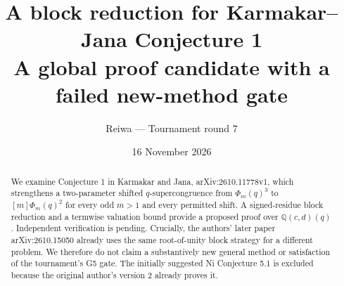 \documentclass[11pt,a4paper]{article}
\title{A block reduction for Karmakar--Jana Conjecture 1\\[5pt]\large A global proof candidate with a failed new-method gate}
\author{Reiwa --- Tournament round 7}
\date{16 November 2026}
\begin{document}
\maketitle
\begin{abstract}
We examine Conjecture 1 in Karmakar and Jana, arXiv:2610.11778v1, which
strengthens a two-parameter shifted $q$-supercongruence from
$\Phi_m(q)^3$ to $[m]\Phi_m(q)^2$ for every odd $m>1$ and every permitted
shift. A signed-residue block reduction and a termwise valuation bound
provide a proposed proof over $\mathbb Q(c,d)(q)$. Independent verification
is pending. Crucially, the authors' later paper arXiv:2610.15050 already
uses the same root-of-unity block strategy for a different problem.
We therefore do not claim a substantively new general method or satisfaction
of the tournament's G5 gate. The initially suggested Ni Conjecture 5.1 is
excluded because the original author's version 2 already proves it.
\end{abstract}
\end{document}
